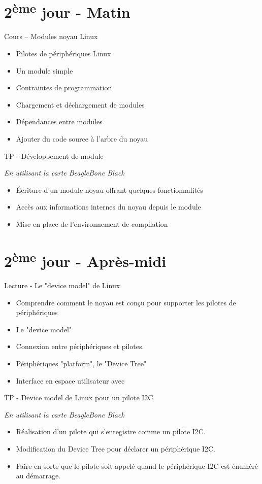 \documentclass[a4paper,12pt,obeyspaces,spaces,hyphens]{article}
\begin{document}
\section{2\textsuperscript{ème} jour - Matin}

\feagendatwocolumn
{Cours – Modules noyau Linux}
{
  \begin{itemize}
  \item Pilotes de périphériques Linux
  \item Un module simple
  \item Contraintes de programmation
  \item Chargement et déchargement de modules
  \item Dépendances entre modules
  \item Ajouter du code source à l'arbre du noyau
  \end{itemize}
}
{TP - Développement de module}
{
  {\em En utilisant la carte BeagleBone Black}
  \begin{itemize}
  \item Écriture d'un module noyau offrant quelques fonctionnalités
  \item Accès aux informations internes du noyau depuis le module
  \item Mise en place de l'environnement de compilation
  \end{itemize}
}

\section{2\textsuperscript{ème} jour - Après-midi}

\feagendatwocolumn
{Lecture - Le "device model" de Linux}
{
  \begin{itemize}
  \item Comprendre comment le noyau est conçu pour supporter les pilotes
    de périphériques
  \item Le "device model"
  \item Connexion entre périphériques et pilotes.
  \item Périphériques "platform", le "Device Tree"
  \item Interface en espace utilisateur avec 
  \end{itemize}
}
{TP - Device model de Linux pour un pilote I2C}
{
  {\em En utilisant la carte BeagleBone Black}
  \begin{itemize}
  \item Réalisation d'un pilote qui s'enregistre comme
     un pilote I2C.
  \item Modification du Device Tree pour déclarer un
     périphérique I2C.
  \item Faire en sorte que le pilote soit appelé quand le
     périphérique I2C est énuméré au démarrage.
  \end{itemize}
}
\end{document}
